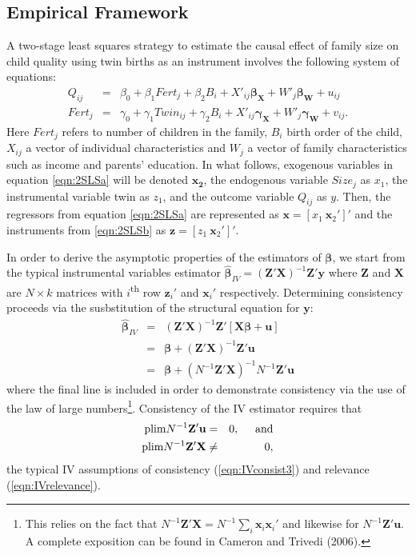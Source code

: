 \documentclass{article}[11pt,subeqn]
\newcommand{\vect}[1]{\mathbf{#1}}
\begin{document}
\begin{spacing}{1.5}
\section{Empirical Framework}
\label{scn:EF}
A two-stage least squares strategy to estimate the causal effect of family size on child quality using twin births as an instrument involves the following system of equations:
\begin{subequations}
\label{eqn:2SLS}
\begin{eqnarray}
\label{eqn:QQ}
Q_{ij}&=&\beta_0+\beta_1Fert_j+\beta_2B_{i}+X'_{ij}\vect{\beta_{\vect{X}}}+W'_j\vect{\beta_\vect{W}}+u_{ij} \label{eqn:2SLSa}\\
Fert_{j}&=&\gamma_0+\gamma_1Twin_{ij}+\gamma_2B_{i}+X'_{ij}\vect{\gamma_\vect{X}}+W'_j\vect{\gamma_\vect{W}}+v_{ij}. \label{eqn:2SLSb}
 \end{eqnarray}
\end{subequations}
Here $Fert_j$ refers to number of children in the family, $B_i$ birth order of the child, $X_{ij}$ a vector
of individual characteristics and $W_j$ a vector of family characteristics such as income and parents' education.
In what follows, exogenous variables in equation \ref{eqn:2SLSa} will be denoted $\mathbf{x_2}$, the
endogenous variable $Size_j$ as $x_1$, the instrumental variable twin as $z_1$, and the outcome variable
$Q_{ij}$ as $y$.  Then, the regressors from equation \ref{eqn:2SLSa} are represented as
$\vect{x}=[x_1\ \vect{x}_2']'$ and the instruments from \ref{eqn:2SLSb} as $\vect{z}=[z_1\ \vect{x}_2']'$.

In order to derive the asymptotic properties of the estimators of $\vect{\beta}$, we start from the typical instrumental variables estimator
$\vect{\hat{\beta}}_{IV}=(\vect{Z}'\vect{X})^{-1}\vect{Z}'\vect{y} $
where $\vect{Z}$ and $\vect{X}$ are $N \times k$ matrices with $i$\textsuperscript{th} row $\vect{z}_i'$ and $\vect{x}_i'$ respectively.  
Determining consistency proceeds via the susbstitution of the structural equation for $\vect{y}$:
\begin{eqnarray}
\label{eqn:IVderive}
\vect{\hat{\beta}}_{IV}&=&(\vect{Z}'\vect{X})^{-1}\vect{Z}'[\vect{X\beta}+\vect{u}] \nonumber\\
&=&\vect{\beta}+(\vect{Z}'\vect{X})^{-1}\vect{Z}'\vect{u}\nonumber\\
&=&\vect{\beta}+(N^{-1}\vect{Z}'\vect{X})^{-1}N^{-1}\vect{Z}'\vect{u}
\end{eqnarray}
where the final line is included in order to demonstrate consistency via the use of the law of large numbers\footnote{This relies
on the fact that $N^{-1}\vect{Z}'\vect{X}=N^{-1}\sum_i\vect{x}_i\vect{x}_i'$ and likewise for $N^{-1}\vect{Z}'\vect{u}$.  A
complete exposition can be found in Cameron and Trivedi (2006).}.  Consistency of the IV estimator requires that
\begin{eqnarray}
\mathrm{plim} N^{-1}\vect{Z'u}&=&0, \hspace{5mm}\mathrm{and} \label{eqn:IVconsist3}\\ 
\mathrm{plim} N^{-1}\vect{Z'X}&\neq&0, \label{eqn:IVrelevance}
\end{eqnarray}
the typical IV assumptions of consistency (\ref{eqn:IVconsist3}) and relevance (\ref{eqn:IVrelevance}).  


\end{spacing}
\end{document}
